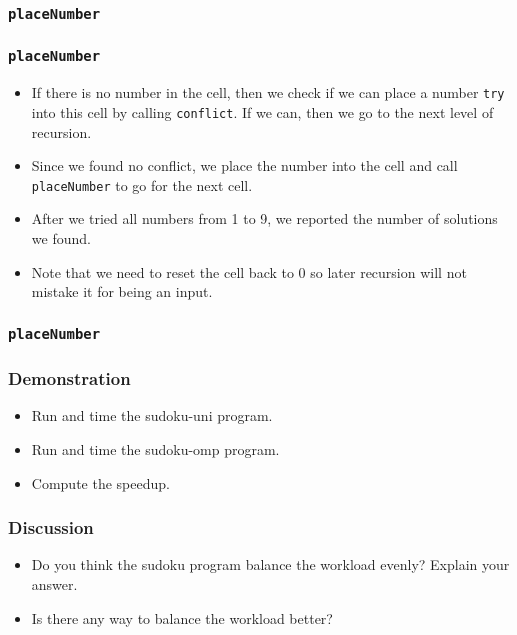 \documentclass{beamer}
\begin{document}
\begin{frame}
\frametitle{\tt placeNumber} 
\end{frame}

\begin{frame}
\frametitle{\tt placeNumber}
\begin{itemize}
\item If there is no number in the cell, then we check if we can place
  a number {\tt try} into this cell by calling {\tt conflict}.  If we can, then we go to the next level of recursion.
\item Since we found no conflict, we place the number into the cell
  and call {\tt placeNumber} to go for the next cell.
\item After we tried all numbers from 1 to 9, we reported the number of
  solutions we found.
\item Note that we need to reset the cell back to 0 so later recursion
  will not mistake it for being an input.
\end{itemize}
\end{frame}


\begin{frame}
\frametitle{\tt placeNumber} 
\end{frame}

\begin{frame}
\frametitle{Demonstration}
\begin{itemize}
\item Run and time the sudoku-uni program.
\item Run and time the sudoku-omp program.
\item Compute the speedup.
\end{itemize}
\end{frame}

\begin{frame}
\frametitle{Discussion}
\begin{itemize}
\item Do you think the sudoku program balance the workload evenly?
  Explain your answer.
\item Is there any way to balance the workload better?
\end{itemize}
\end{frame}
\end{document}
